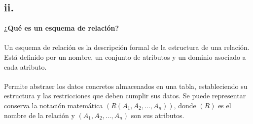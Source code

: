 \subsection*{ii. }

\textbf{¿Qué es un esquema de relación?}\\ \\
Un esquema de relación es la descripción formal de la estructura de una relación. Está definido por un nombre, un conjunto de atributos y un dominio asociado a cada atributo. \\ \\
Permite abstraer los datos concretos almacenados en una tabla, estableciendo su estructura y las restricciones que deben cumplir sus datos. Se puede representar conserva la notación matemática $(R(A_1,A_2,\ldots,A_n))$, donde $(R)$ es el nombre de la relación y $(A_1,A_2,\ldots,A_n)$ son sus atributos.